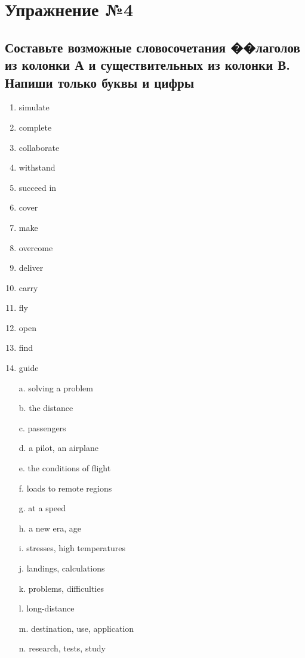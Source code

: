 \section{Упражнение №4}
\subsection*{Составьте возможные словосочетания ��лаголов из колонки А и существительных из колонки В. Напиши только буквы и цифры}

\begin{enumerate}
      \item simulate
      \item complete
      \item collaborate
      \item withstand
      \item succeed in
      \item cover
      \item make
      \item overcome
      \item deliver
      \item carry
      \item fly
      \item open
      \item find
      \item guide
\end{enumerate}

\begin{itemize}
      \item[a.] solving a problem
      \item[b.] the distance
      \item[c.] passengers
      \item[d.] a pilot, an airplane
      \item[e.] the conditions of flight
      \item[f.] loads to remote regions
      \item[g.] at a speed
      \item[h.] a new era, age
      \item[i.] stresses, high temperatures
      \item[j.] landings, calculations
      \item[k.] problems, difficulties
      \item[l.] long-distance
      \item[m.] destination, use, application
      \item[n.] research, tests, study
\end{itemize}

